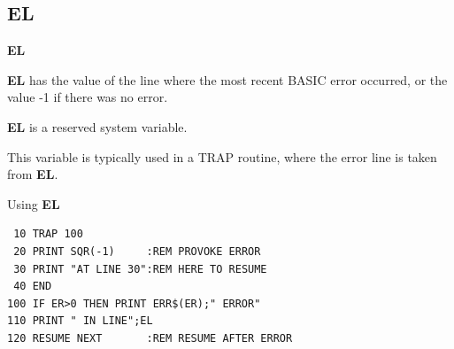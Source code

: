 \subsection{EL}
\begin{description}[leftmargin=2cm,style=nextline]
\item [Format:] {\bf EL}
\item [Usage:]  {\bf EL} has the value of the line where
               the most recent BASIC error occurred,
                or the value -1 if there was no error.
\item [Remarks:] {\bf EL} is a reserved system variable.

This variable is typically used in a TRAP routine,
where the error line is taken from {\bf EL}.

\item [Example:] Using {\bf EL}
\begin{tcolorbox}[colback=black,coltext=white]
\verbatimfont{\codefont}
\begin{verbatim}
 10 TRAP 100
 20 PRINT SQR(-1)     :REM PROVOKE ERROR
 30 PRINT "AT LINE 30":REM HERE TO RESUME
 40 END
100 IF ER>0 THEN PRINT ERR$(ER);" ERROR"
110 PRINT " IN LINE";EL
120 RESUME NEXT       :REM RESUME AFTER ERROR
\end{verbatim}
\end{tcolorbox}
\end{description}


\newpage
